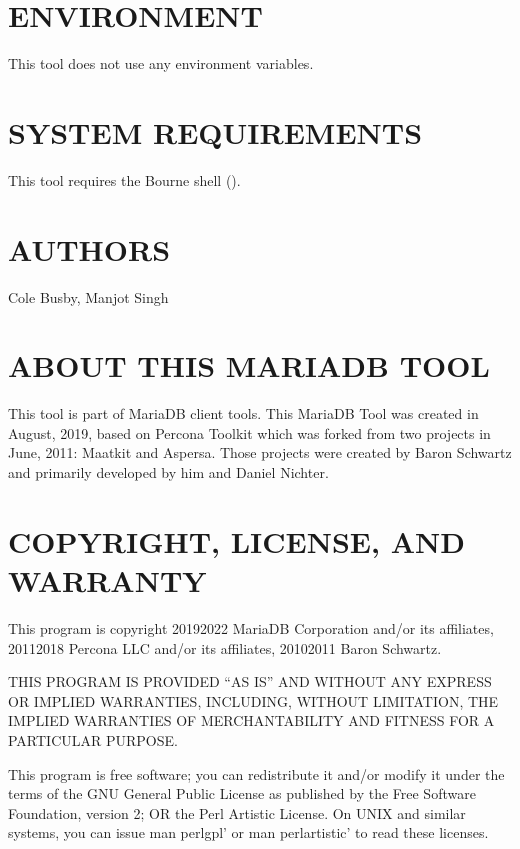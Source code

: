 \documentclass[letterpaper,10pt,english]{sphinxmanual}
\begin{document}
\section{ENVIRONMENT}
\label{\detokenize{mariadb-summary:environment}}
This tool does not use any environment variables.


\section{SYSTEM REQUIREMENTS}
\label{\detokenize{mariadb-summary:system-requirements}}
This tool requires the Bourne shell ().


\section{AUTHORS}
\label{\detokenize{mariadb-summary:authors}}
Cole Busby, Manjot Singh


\section{ABOUT THIS MARIADB TOOL}
\label{\detokenize{mariadb-summary:about-this-mariadb-tool}}
This tool is part of MariaDB client tools. This MariaDB Tool was created in
August, 2019, based on Percona Toolkit which was
forked from two projects in June, 2011: Maatkit and Aspersa.  Those projects
were created by Baron Schwartz and primarily developed by him and Daniel Nichter.


\section{COPYRIGHT, LICENSE, AND WARRANTY}
\label{\detokenize{mariadb-summary:copyright-license-and-warranty}}
This program is copyright 2019\sphinxhyphen{}2022 MariaDB Corporation and/or its affiliates,
2011\sphinxhyphen{}2018 Percona LLC and/or its affiliates, 2010\sphinxhyphen{}2011 Baron Schwartz.

THIS PROGRAM IS PROVIDED “AS IS” AND WITHOUT ANY EXPRESS OR IMPLIED
WARRANTIES, INCLUDING, WITHOUT LIMITATION, THE IMPLIED WARRANTIES OF
MERCHANTABILITY AND FITNESS FOR A PARTICULAR PURPOSE.

This program is free software; you can redistribute it and/or modify it under
the terms of the GNU General Public License as published by the Free Software
Foundation, version 2; OR the Perl Artistic License.  On UNIX and similar
systems, you can issue \textasciigrave{}man perlgpl’ or \textasciigrave{}man perlartistic’ to read these
licenses.
\end{document}
